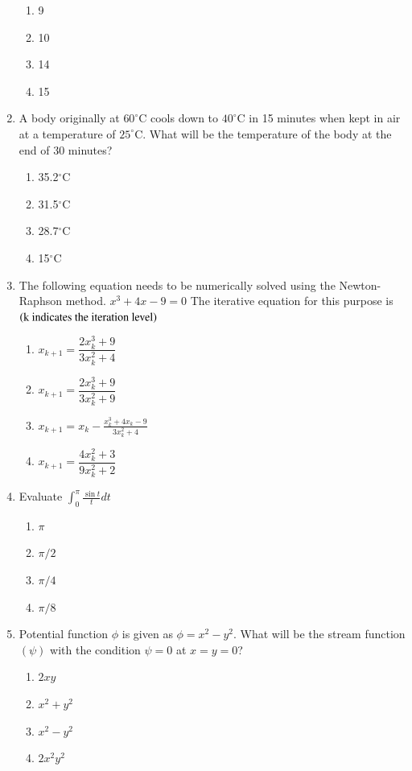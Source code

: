\documentclass[journal,12pt,onecolumn]{IEEEtran}
\theoremstyle{remark}
\begin{document}
\begin{enumerate}
\hfill{}
\begin{enumerate}
\item 9
\item 10
\item 14
\item 15
\end{enumerate}

\item A body originally at $60^\circ$C cools down to $40^\circ$C in 15 minutes when kept in air at a temperature of $25^\circ$C. What will be the temperature of the body at the end of 30 minutes?

\hfill{}

\begin{enumerate}
\item 35.2$^\circ$C
\item 31.5$^\circ$C
\item 28.7$^\circ$C
\item 15$^\circ$C
\end{enumerate}

\item The following equation needs to be numerically solved using the Newton-Raphson method. $x^3 + 4x - 9 = 0$
The iterative equation for this purpose is $\left(\text{k indicates the iteration level}\right)$
\hfill{}
\begin{enumerate}
\item $x_{k+1} = \dfrac{2x_k^3 + 9}{3x_k^2 + 4}$
\item $x_{k+1} = \dfrac{2x_k^3 + 9}{3x_k^2 + 9}$
\item $x_{k+1} = x_k - \frac{x_k^3 + 4x_k - 9}{3x_k^2 + 4}$
\item $x_{k+1} = \dfrac{4x_k^2 + 3}{9x_k^2 + 2}$
\end{enumerate}

\item Evaluate $\int_0^\pi \frac{\sin t}{t} dt$
\hfill{}
\begin{enumerate}
\item $\pi$
\item $\pi/2$
\item $\pi/4$
\item $\pi/8$
\end{enumerate}

\item Potential function $\phi$ is given as $\phi = x^2 - y^2$. What will be the stream function $(\psi)$ with the condition $\psi = 0$ at $x = y = 0$?
\hfill{}
\begin{enumerate}
\item $2xy$
\item $x^2 + y^2$
\item $x^2 - y^2$
\item $2x^2y^2$
\end{enumerate}


\end{enumerate}
\end{document}
